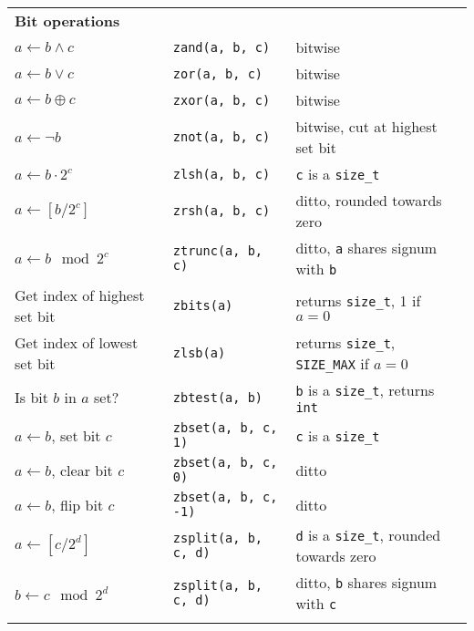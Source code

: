 \documentclass[10pt,draft]{article}
\begin{document}
\begin{tabular}{lll}

\textbf{Bit operations}       & {}                         & {}                                                \\
$a \gets b \wedge c$          & {\tt zand(a, b, c)}        & bitwise                                           \\
$a \gets b \vee c$            & {\tt zor(a, b, c)}         & bitwise                                           \\
$a \gets b \oplus c$          & {\tt zxor(a, b, c)}        & bitwise                                           \\
$a \gets \lnot b$             & {\tt znot(a, b, c)}        & bitwise, cut at highest set bit                   \\
$a \gets b \cdot 2^c$         & {\tt zlsh(a, b, c)}        & {\tt c} is a {\tt size\_t}                        \\
$a \gets [b / 2^c]$           & {\tt zrsh(a, b, c)}        & ditto, rounded towards zero                       \\
$a \gets b \mod 2^c$          & {\tt ztrunc(a, b, c)}      & ditto, {\tt a} shares signum with {\tt b}         \\
Get index of highest set bit  & {\tt zbits(a)}             & returns {\tt size\_t}, 1 if $a = 0$               \\
Get index of lowest set bit   & {\tt zlsb(a)}              & returns {\tt size\_t}, {\tt SIZE\_MAX} if $a = 0$ \\
Is bit $b$ in $a$ set?        & {\tt zbtest(a, b)}         & {\tt b} is a {\tt size\_t}, returns {\tt int}     \\
$a \gets b$, set bit $c$      & {\tt zbset(a, b, c, 1)}    & {\tt c} is a {\tt size\_t}                        \\
$a \gets b$, clear bit $c$    & {\tt zbset(a, b, c, 0)}    & ditto                                             \\
$a \gets b$, flip bit $c$     & {\tt zbset(a, b, c, -1)}   & ditto                                             \\
$a \gets [c / 2^d]$           & {\tt zsplit(a, b, c, d)}   & {\tt d} is a {\tt size\_t}, rounded towards zero  \\
$b \gets c \mod 2^d$          & {\tt zsplit(a, b, c, d)}   & ditto, {\tt b} shares signum with {\tt c}         \\
\\


\end{tabular}
\end{document}
